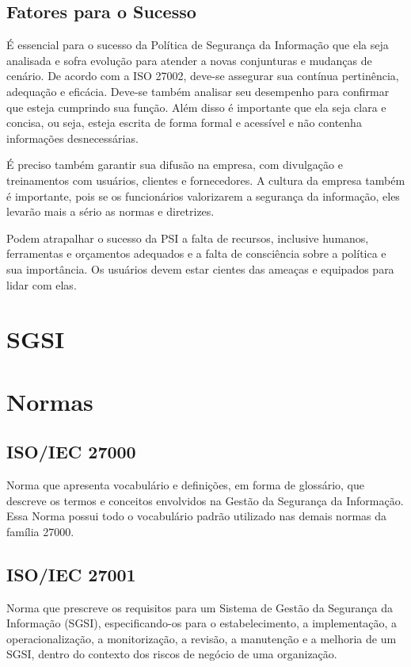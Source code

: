 \documentclass[12pt]{article}
\begin{document}
\subsection{Fatores para o Sucesso}
É essencial para o sucesso da Política de Segurança da Informação que
ela seja analisada e sofra evolução para atender a novas conjunturas e mudanças de cenário.
De acordo com a ISO 27002, deve-se assegurar sua contínua pertinência, adequação e eficácia.
Deve-se também analisar seu desempenho para confirmar que esteja cumprindo sua função. Além disso é importante que
ela seja clara e concisa, ou seja, esteja escrita de forma formal e acessível e não contenha informações desnecessárias.

É preciso também garantir sua difusão na empresa, com divulgação e treinamentos com usuários, clientes e fornecedores.
A cultura da empresa também é importante, pois se os funcionários valorizarem a segurança da informação,
eles levarão mais a sério as normas e diretrizes.

Podem atrapalhar o sucesso da PSI a falta de recursos, inclusive humanos, 
ferramentas e orçamentos adequados e a falta de consciência sobre a política e sua importância.
Os usuários devem estar cientes das ameaças e equipados para lidar com elas.

\section{SGSI}


\section{Normas}
\subsection{ISO/IEC 27000}
Norma que apresenta vocabulário e definições, em forma de glossário, que descreve os termos e conceitos envolvidos na
Gestão da Segurança da Informação. Essa Norma possui todo o vocabulário padrão utilizado nas demais normas da família 27000.

\subsection{ISO/IEC 27001}
Norma que prescreve os requisitos para um Sistema de Gestão da Segurança da Informação (SGSI), especificando-os para o estabelecimento,
a implementação, a operacionalização, a monitorização, a revisão, a manutenção e a melhoria de um SGSI, dentro do contexto dos
riscos de negócio de uma organização.
\end{document}
